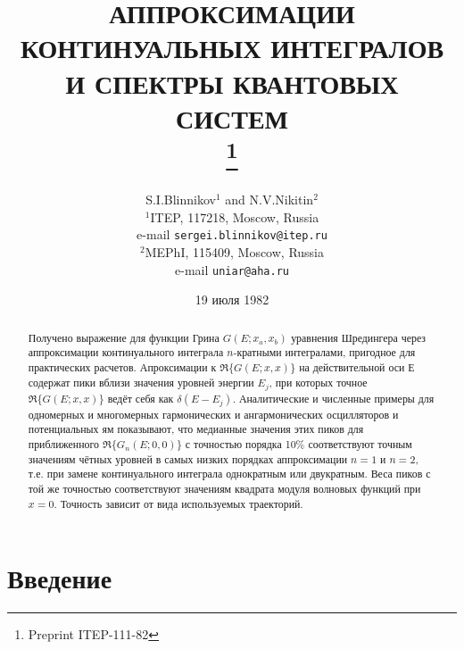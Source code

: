 \documentclass[11pt]{article}
\title{АППРОКСИМАЦИИ КОНТИНУАЛЬНЫХ ИНТЕГРАЛОВ И СПЕКТРЫ КВАНТОВЫХ СИСТЕМ
\\
       \thanks{Preprint ITEP-111-82}}%
\author{S.I.Blinnikov$^1$ and N.V.Nikitin$^2$ \\
   $^1$ITEP, 117218, Moscow, Russia \\
e-mail {\tt sergei.blinnikov@itep.ru} \\
$^2$MEPhI, 115409, Moscow, Russia \\ %
e-mail {\tt uniar@aha.ru} }
\date{19 июля 1982}%
\begin{document}
\begin{titlepage}
\maketitle
\thispagestyle{empty}

\begin{abstract}
Получено выражение для функции Грина $G(E;x_a,x_b)$  уравнения Шредингера через аппроксимации континуального интегрaла
$n$-кратными интегралами, пригодное для практических расчетов.
Апроксимации к $\Re\{G(E;x,x)\}$  на действительной оси $Е$ содержат пики
вблизи значения уровней энергии  $E_{j}$, при которых точное $\Re\{G(E;x,x)\}$ ведёт себя как $\delta(E-E_j)$.
Аналитические и численные примеры для одномерных и многомерных гармонических и ангармонических осцилляторов
и потенциальных ям показывают, что медианные значения этих
пиков для приближенного  $\Re\{G_n(E;0,0)\}$ с точностью порядка 10\% соответствуют точным значениям чётных
уровней в самых низких
порядках аппроксимации $n=1$  и $n=2$, т.е. при замене континуального интеграла однократным или двукратным.
Веса пиков с той же точностью соответствуют значениям квадрата модуля волновых функций при  $x=0$.
Точность зависит от вида используемых траекторий.

\end{abstract}
\end{titlepage}


\section{Введение}
\end{document}
